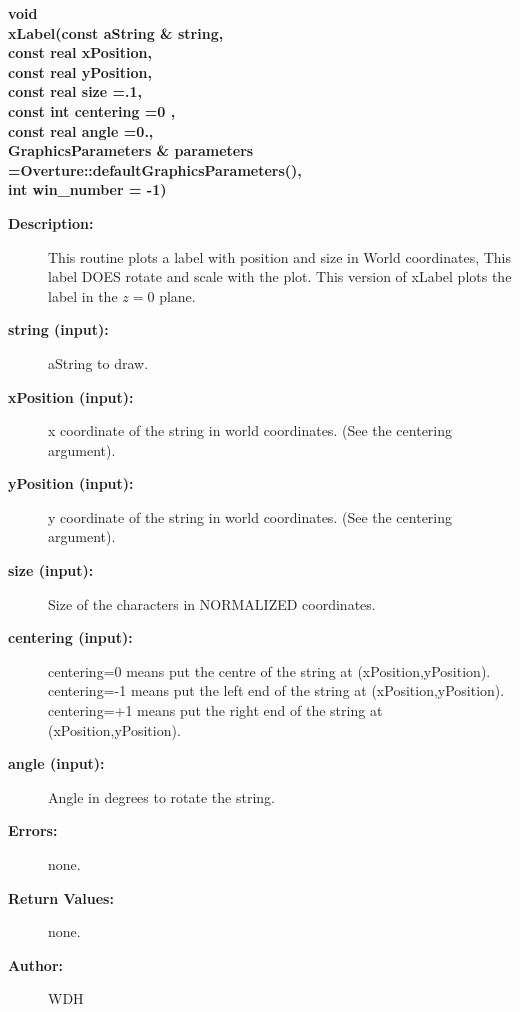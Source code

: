 \begin{flushleft} \textbf{%
void   \\ 
\settowidth{\GLGraphicsInterfaceIncludeArgIndent}{xLabel(}%
xLabel(const aString \& string,     \\ 
\hspace{\GLGraphicsInterfaceIncludeArgIndent}const real xPosition, \\ 
\hspace{\GLGraphicsInterfaceIncludeArgIndent}const real yPosition,\\ 
\hspace{\GLGraphicsInterfaceIncludeArgIndent}const real size =.1,\\ 
\hspace{\GLGraphicsInterfaceIncludeArgIndent}const int centering =0 , \\ 
\hspace{\GLGraphicsInterfaceIncludeArgIndent}const real angle =0.,\\ 
GraphicsParameters \& parameters   =Overture::defaultGraphicsParameters(),\\ 
\hspace{\GLGraphicsInterfaceIncludeArgIndent}int win\_number  = -1)
}\end{flushleft}
\begin{description}
\item[{\bf Description:}] 
    This routine plots a label with position and size in World coordinates, 
    This label DOES rotate and scale with the plot. This version of xLabel plots
    the label in the $z=0$ plane.
\item[{\bf string (input):}]  aString to draw.
\item[{\bf xPosition (input):}]  x coordinate of the string in world coordinates. (See the
    centering argument).
\item[{\bf yPosition (input):}]  y coordinate of the string in world coordinates. (See the
     centering argument).
\item[{\bf size (input):}]  Size of the characters in NORMALIZED coordinates.
\item[{\bf centering (input):}]  {\ff centering=0} means put the centre of the string at {\ff (xPosition,yPosition)}.
    {\ff centering=-1} means put the left end of the string at {\ff (xPosition,yPosition)}.
    {\ff centering=+1} means put the right end of the string at {\ff (xPosition,yPosition)}.
\item[{\bf angle (input):}]  Angle in degrees to rotate the string.
\item[{\bf Errors:}]  none.
\item[{\bf Return Values:}]  none.
  
\item[{\bf Author:}]  WDH
\end{description}
